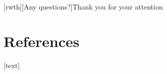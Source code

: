 \documentclass[t]{beamer}
\begin{document}


[rwth][Any questions?]{Thank you for your attention}
\begin{frame}[plain]
\end{frame}

\section{References}
{%
{}[text]


}
\end{document}
